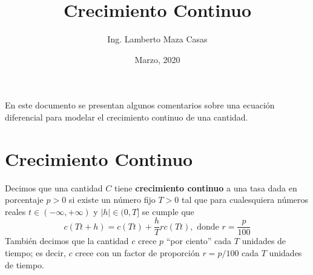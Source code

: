 \documentclass[12pt]{article}
\title{Crecimiento Continuo}
\author{Ing. Lamberto Maza Casas}
\date{Marzo, 2020}
\begin{document}
\maketitle
En este documento se presentan algunos comentarios sobre una ecuaci\'{o}n diferencial  
para modelar el crecimiento continuo de una cantidad.
\section{Crecimiento Continuo}
Decimos que una cantidad $C$ tiene {\bf crecimiento continuo} a una tasa dada en porcentaje 
$p>0$ si existe un n\'{u}mero f\/ijo $T>0$ tal que para cualesquiera n\'{u}meros reales 
$t\in(-\infty,+\infty)$ y $|h|\in(0,T]$ se cumple que
\begin{equation}
c(Tt+h)=c(Tt)+\frac{h}{T}rc(Tt),\mbox{\ donde\ }r=\frac{p}{100}
\end{equation}
Tambi\'{e}n decimos que la cantidad $c$ crece $p$ ``por ciento'' cada $T$ unidades de tiempo; es decir, 
$c$ crece con un factor de proporci\'{o}n $r=p/100$ cada $T$ unidades de tiempo.
\end{document}
